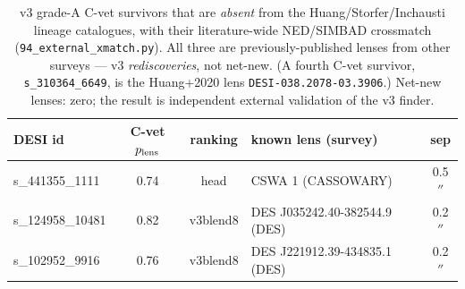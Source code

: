 \begin{table}[t]\centering
\caption{v3 grade-A C-vet survivors that are \emph{absent} from the Huang/Storfer/Inchausti lineage catalogues, with their literature-wide NED/SIMBAD crossmatch (\texttt{94\_external\_xmatch.py}). All three are previously-published lenses from other surveys --- v3 \emph{rediscoveries}, not net-new. (A fourth C-vet survivor, \texttt{s\_310364\_6649}, is the Huang+2020 lens \texttt{DESI-038.2078-03.3906}.) Net-new lenses: zero; the result is independent external validation of the v3 finder.}
\label{tab:qualified}\small
\begin{tabular}{lcclc}
\toprule
DESI id & C-vet $p_{\rm lens}$ & ranking & known lens (survey) & sep\\
\midrule
s\_441355\_1111 & 0.74 & head & CSWA 1 (CASSOWARY) & 0.5$''$\\
s\_124958\_10481 & 0.82 & v3blend8 & DES J035242.40-382544.9 (DES) & 0.2$''$\\
s\_102952\_9916 & 0.76 & v3blend8 & DES J221912.39-434835.1 (DES) & 0.2$''$\\
\bottomrule
\end{tabular}
\end{table}
